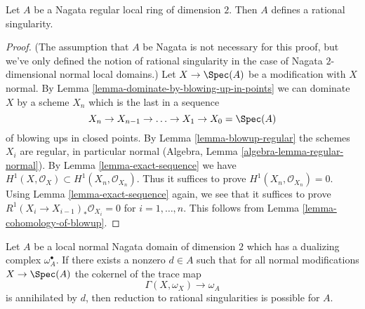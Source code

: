 \begin{lemma}
\label{lemma-regular-rational}
Let $A$ be a Nagata regular local ring of dimension $2$. Then $A$ defines
a rational singularity.
\end{lemma}

\begin{proof}
(The assumption that $A$ be Nagata is not necessary for this proof,
but we've only defined the notion of rational singularity in the
case of Nagata $2$-dimensional normal local domains.)
Let $X \to \Spec(A)$ be a modification with $X$ normal. By
Lemma \ref{lemma-dominate-by-blowing-up-in-points}
we can dominate $X$ by a scheme $X_n$ which is the last in a sequence
$$
X_n \to X_{n - 1} \to \ldots \to X_1 \to X_0 = \Spec(A)
$$
of blowing ups in closed points. By Lemma \ref{lemma-blowup-regular}
the schemes $X_i$ are regular, in particular
normal (Algebra, Lemma \ref{algebra-lemma-regular-normal}).
By Lemma \ref{lemma-exact-sequence} we have
$H^1(X, \mathcal{O}_X) \subset H^1(X_n, \mathcal{O}_{X_n})$.
Thus it suffices to prove $H^1(X_n, \mathcal{O}_{X_n}) = 0$.
Using Lemma \ref{lemma-exact-sequence} again, we
see that it suffices to prove $R^1(X_i \to X_{i - 1})_*\mathcal{O}_{X_i} = 0$
for $i = 1, \ldots, n$. This follows from
Lemma \ref{lemma-cohomology-of-blowup}.
\end{proof}

\begin{lemma}
\label{lemma-bound-dualizing-implies-bound}
Let $A$ be a local normal Nagata domain of dimension $2$ which has a
dualizing complex $\omega_A^\bullet$. If there exists a nonzero $d \in A$
such that for all normal modifications $X \to \Spec(A)$ the cokernel of the
trace map
$$
\Gamma(X, \omega_X) \to \omega_A
$$
is annihilated by $d$, then reduction to rational singularities
is possible for $A$.
\end{lemma}

